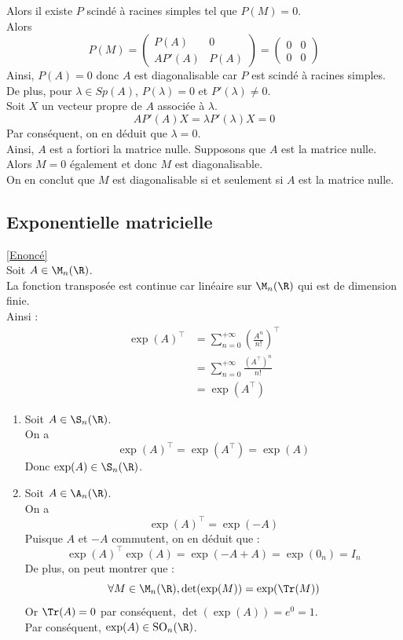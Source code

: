 \documentclass[8pt]{book}
\begin{document}
\begin{enumerate}
		Alors il existe $P$ scindé à racines simples tel que $P(M)=0$.\\
		Alors \[P(M)=\left(\begin{array}{c|c}
			P(A)&0  \\
			\hline
			AP'(A)&P(A)
		\end{array}\right)=\left(\begin{array}{c|c}
		0&0  \\
		\hline
		0&0
		\end{array}\right)\]
		Ainsi, $P(A)=0$ donc $A$ est diagonalisable car $P$ est scindé à racines simples.\\
		De plus, pour $\lambda\in Sp(A)$, $P(\lambda)=0$ et $P'(\lambda)\ne 0$.\\
		Soit $X$ un vecteur propre de $A$ associée à $\lambda$.\\
		\[AP'(A)X=\lambda P'(\lambda)X=0\]
		Par conséquent, on en déduit que $\lambda=0$.\\
		Ainsi, $A$ est a fortiori la matrice nulle.
		Supposons que $A$ est la matrice nulle.\\
		Alors $M=0$ également et donc $M$ est diagonalisable.\\
		On en conclut que $M$ est diagonalisable si et seulement si $A$ est la matrice nulle.
	\end{enumerate}
	\subsection{Exponentielle matricielle}
	\label{Exponentielle matricielle corrigé}
	\textcolor{blue}{\hyperref[Exponentielle matricielle]{[Enoncé]}}\\
	
		Soit $A\in\M_n(\R)$.\\
		La fonction transposée est continue car linéaire sur $\M_n(\R)$ qui est de dimension finie.\\
		Ainsi :
		\begin{align*}
			\exp(A)^\top&=\sum_{n=0}^{+\infty}\left(\frac{A^n}{n!}\right)^\top\\
			&=\sum_{n=0}^{+\infty}\frac{(A^\top)^n}{n!}\\
			&=\exp(A^\top)
		\end{align*}
		\begin{enumerate}
		\item Soit $A\in\S_n(\R)$.\\
		On a \[\exp(A)^\top=\exp(A^\top)=\exp(A)\]
		Donc $\exp(A)\in\S_n(\R)$.
		\item Soit $A\in\A_n(\R)$.\\
		On a \[\exp(A)^\top=\exp(-A)\]
		Puisque $A$ et $-A$ commutent, on en déduit que :
		\[\exp(A)^\top\exp(A)=\exp(-A+A)=\exp(0_n)=I_n\]
		De plus, on peut montrer que :
		\[\forall M\in\M_n(\R), \det(\exp(M))=\exp(\Tr(M))\]
		Or $\Tr(A)=0$ par conséquent, $\det(\exp(A))=e^0=1$.\\
		Par conséquent, $\exp(A)\in  \text{SO}_n(\R)$.
	\end{enumerate}
\end{document}
